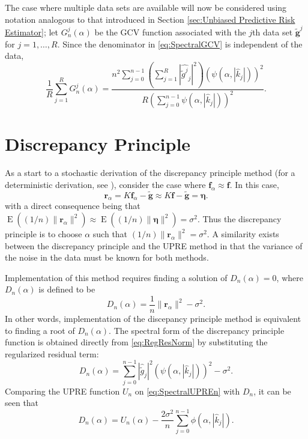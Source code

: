 \documentclass[12pt]{book}
\newcommand{\gnoise}{\widetilde{g}}	%
\newcommand{\gnoiseVec}{\widetilde{\mathbf{g}}}	%
\newcommand{\kMat}{K}	%
\newcommand{\fVec}{\mathbf{f}}	%
\newcommand{\regparam}{\alpha}
\newcommand{\freg}{\fVec_{\regparam}}	%
\newcommand{\filt}{\phi}
\newcommand{\mfilt}{\psi}
\newcommand{\noise}{\eta}	%
\newcommand{\noiseSD}{\sigma}	%
\newcommand{\noiseVec}{\bm{\noise}}	%
\DeclareMathOperator{\E}{E}	%
\newcommand{\regres}{\mathbf{r}_{\regparam}}	%
\newcommand{\U}{U}	%
\newcommand{\GCV}{G}	%
\newcommand{\D}{D}	%
\begin{document}
The case where multiple data sets are available will now be considered using notation analogous to that introduced in Section \ref{sec:Unbiased Predictive Risk Estimator}; let $\GCV_n^j(\regparam)$ be the GCV function associated with the $j$th data set $\gnoiseVec^j$ for $j = 1,\ldots,R$. Since the denominator in \eqref{eq:SpectralGCV} is independent of the data,
\begin{equation}
\frac{1}{R}\sum_{j=1}^R \GCV_n^j(\regparam)  = \frac{n^2\sum_{j = 0}^{n-1} \left(\sum_{j=1}^R |\widehat{\gnoise^j}_j|^2\right)(\mfilt(\regparam,|\widehat{k}_j|))^2}{R(\sum_{j = 0}^{n-1} \mfilt(\regparam,|\widehat{k}_j|))^2}.
\label{eq:SpectralGCVsum}
\end{equation}

\section{Discrepancy Principle} \label{sec:Discrepancy Principle}
As a start to a stochastic derivation of the discrepancy principle method (for a deterministic derivation, see \cite{Vogel:2002}), consider the case where $\freg \approx \fVec$. In this case,
\[\regres = \kMat\freg - \gnoiseVec \approx \kMat\fVec - \gnoiseVec = \noiseVec.\]
with a direct consequence being that $\E((1/n)\|\regres\|^2) \approx \E((1/n)\|\noiseVec\|^2) =\noiseSD^2$. Thus the discrepancy principle is to choose $\regparam$ such that $(1/n)\|\regres\|^2 = \noiseSD^2$. A similarity exists between the discrepancy principle and the UPRE method in that the variance of the noise in the data must be known for both methods. \par 
Implementation of this method requires finding a solution of $\D_n(\regparam) = 0$, where $\D_n(\regparam)$ is defined to be
\begin{equation}
\label{eq:DP}
\D_n(\regparam) = \frac{1}{n}\|\regres\|^2 - \noiseSD^2.
\end{equation}
In other words, implementation of the discepancy principle method is equivalent to finding a root of $\D_n(\regparam)$. The spectral form of the discrepancy principle function is obtained directly from \eqref{eq:RegResNorm} by substituting the regularized residual term:
\begin{equation}
\D_n(\regparam) = \sum_{j = 0}^{n-1} |\widehat{\gnoise}_j|^2(\mfilt(\regparam,|\widehat{k}_j|))^2 - \noiseSD^2.
\label{eq:SpectralDP}
\end{equation}
Comparing the UPRE function $\U_n$ on \eqref{eq:SpectralUPREn} with $\D_n$, it can be seen that
\begin{equation}
\label{eq:UPRE DP Comp}
\D_n(\regparam) = \U_n(\regparam) - \frac{2\noiseSD^2}{n}\sum_{j = 0}^{n-1} \filt(\regparam,|\widehat{k}_j|).
\end{equation}
\end{document}
